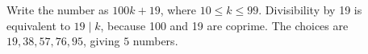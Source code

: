 Write the number as $100k+19$, where $10\le k\le99$. Divisibility by 19 is equivalent to $19\mid k$, because 100 and 19 are coprime. The choices are $19,38,57,76,95$, giving $\boxed5$ numbers.
